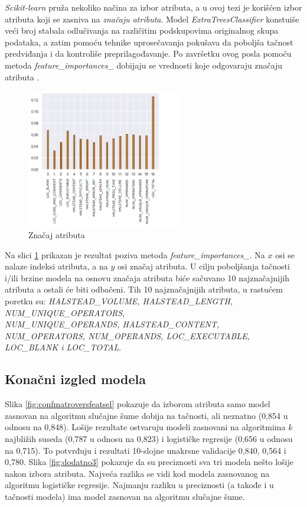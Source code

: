 \documentclass[12pt,oneside]{memoir}
\begin{document}
\textit{Scikit-learn} pruža nekoliko načina za izbor atributa, a u ovoj tezi je korišćen izbor atributa koji se zasniva na \textit{značaju atributa}. Model \textit{ExtraTreesClassifier} konstuiše veći broj stabala odlučivanja na različitim podskupovima originalnog skupa podataka, a zatim pomoću tehnike uprosečavanja pokušava da poboljša tačnost predviđanja i da kontroliše preprilagođavanje. Po završetku ovog posla pomoću metoda \textit{feature\_importances\_} dobijaju se vrednosti koje odgovaraju značaju atributa \cite{scikit-learn}. 

\begin{figure}[!ht]
  \centering
  \includegraphics[width=0.60\textwidth]{izbor_atributa}
  \caption{Značaj atributa}
  \label{fig:znacaj}
\end{figure}

Na slici \ref{fig:znacaj} prikazan je rezultat poziva metoda \textit{feature\_importances\_}. Na $x$ osi se nalaze indeksi atributa, a na $y$ osi značaj atributa. U cilju poboljšanja tačnosti i/ili brzine modela na osnovu značaja atributa biće sačuvano 10 najznačajnijih atributa a ostali će biti odbačeni. Tih 10 najznačajnijih atributa, u rastućem poretku su: \textit{HALSTEAD\_VOLUME, 
HALSTEAD\_LENGTH, 
NUM\_UNIQUE\_OPERATORS, \\
NUM\_UNIQUE\_OPERANDS, 
HALSTEAD\_CONTENT,
NUM\_OPERATORS, 
NUM\_OPERANDS, LOC\_EXECUTABLE, 
LOC\_BLANK i LOC\_TOTAL}.

\subsection{Konačni izgled modela}

Slika \ref{fig:confmatroversfeatsel} pokazuje da izborom atributa samo model zasnovan na algoritmu slučajne šume dobija na tačnosti, ali neznatno (0,854 u odnosu na 0,848). Lošije rezultate ostvaruju modeli zasnovani na algoritmima $k$ najbližih suseda (0,787 u odnosu na 0,823) i logističke regresije (0,656 u odnosu na 0,715). To potvrđuju i rezultati 10-slojne unakrsne validacije 0,840, 0,564 i 0,780. Slika \ref{fig:dodatno3} pokazuje da su preciznosti sva tri modela nešto lošije nakon izbora atributa. Najveća razlika se vidi kod modela zasnovanog na algoritmu logističke regresije. Najmanju razliku u preciznosti (a takođe i u tačnosti modela) ima model zasnovan na algoritmu slučajne šume. 
\end{document}
